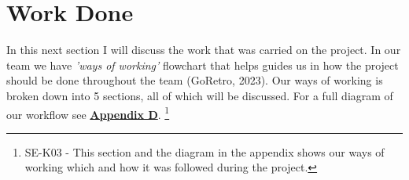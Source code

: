 \section{Work Done}
  In this next section I will discuss the work that was carried on the project. In our team we have \textit{'ways of working'}
  flowchart that helps guides us in how the project should be done throughout the team (GoRetro, 2023). Our ways of working is broken down into 5 sections, 
  all of which will be discussed. For a full diagram of our workflow see \hyperref[sec:AppendixD]{\textbf{Appendix D}}.
  \footnote{SE-K03 - This section and the diagram in the appendix shows our ways of working which and how it was followed during the project.}

  
  
  
  
  

  \newpage
  
  